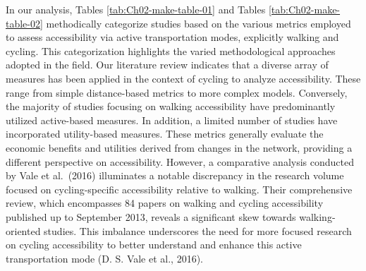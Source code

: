 \documentclass[
11pt, %
oneside, %
english, %
singlespacing, %
]{macthesis} %
\begin{document}
In our analysis, Tables \ref{tab:Ch02-make-table-01} and Tables \ref{tab:Ch02-make-table-02} methodically categorize studies based on the various metrics employed to assess accessibility via active transportation modes, explicitly walking and cycling. This categorization highlights the varied methodological approaches adopted in the field. Our literature review indicates that a diverse array of measures has been applied in the context of cycling to analyze accessibility. These range from simple distance-based metrics to more complex models. Conversely, the majority of studies focusing on walking accessibility have predominantly utilized active-based measures. In addition, a limited number of studies have incorporated utility-based measures. These metrics generally evaluate the economic benefits and utilities derived from changes in the network, providing a different perspective on accessibility. However, a comparative analysis conducted by Vale et al.~(2016) illuminates a notable discrepancy in the research volume focused on cycling-specific accessibility relative to walking. Their comprehensive review, which encompasses 84 papers on walking and cycling accessibility published up to September 2013, reveals a significant skew towards walking-oriented studies. This imbalance underscores the need for more focused research on cycling accessibility to better understand and enhance this active transportation mode (D. S. Vale et al., 2016).
\end{document}
